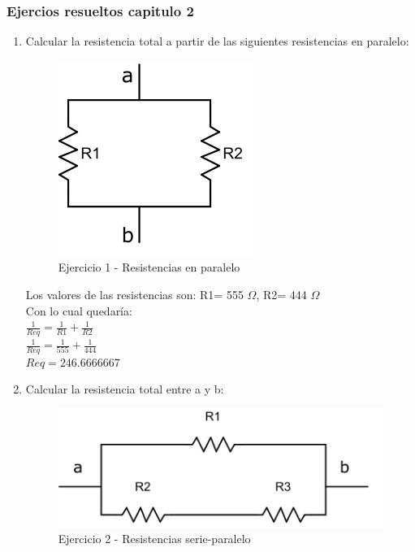 \documentclass[10pt]{article}\usepackage[]{graphicx}\usepackage[]{color}
\begin{document}
	\subsubsection{Ejercios resueltos capitulo 2}
	\begin{enumerate}
\item Calcular la resistencia total a partir de las siguientes resistencias en paralelo:\\

\begin{figure}[h!] %
	\centering
		\includegraphics[scale=1.9]{Imagenes/cap2_ej1_res_paral.png}   
	\caption{Ejercicio 1 - Resistencias en paralelo} \label{fig:cap2_ej1_res_paral.png}
\end{figure}



Los valores de las resistencias son: R1= 555 $\Omega$, R2= 444 $\Omega$ \\

Con lo cual quedaría:\\
{\LARGE $ \frac{1}{Req} =  \frac{1}{R1} + \frac{1}{R2}  $}\\

{\LARGE $ \frac{1}{Req} =  \frac{1}{ 555} + \frac{1}{444}  $}\\



 $Req = 246.6666667$\\

\item Calcular la resistencia total entre a y b:\\

\begin{figure}[h!] %
	\centering
		\includegraphics[scale=1]{Imagenes/cap2_ej2_res_paral.png}   
	\caption{Ejercicio 2 - Resistencias serie-paralelo} \label{fig:cap2_ej2_res_paral.png}
\end{figure}




\end{enumerate}
\end{document}
